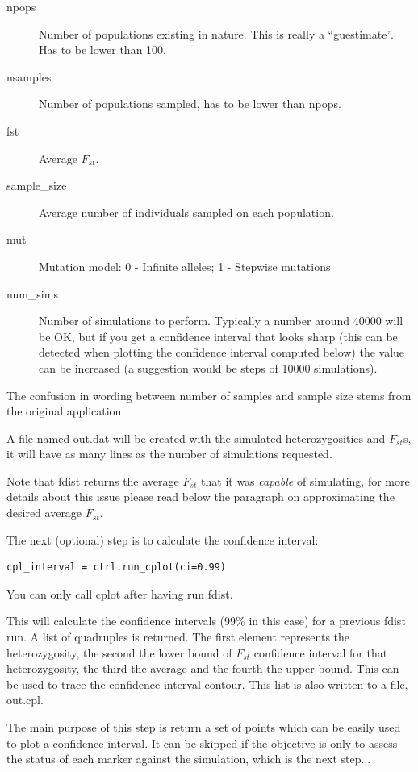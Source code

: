 \documentclass{report}
\begin{document}
\begin{description}
\item[npops] Number of populations existing in nature. This is really a
    ``guestimate''. Has to be lower than 100.
\item[nsamples] Number of populations sampled, has to be lower than npops.
\item[fst] Average $F_{st}$.
\item[sample\_size] Average number of individuals sampled on each population.
\item[mut] Mutation model: 0 - Infinite alleles; 1 - Stepwise mutations
\item[num\_sims] Number of simulations to perform. Typically a number around
    40000 will be OK, but if you get a confidence interval that looks sharp
    (this can be detected when plotting the confidence interval computed
    below) the value can be increased (a suggestion would be steps of 10000
    simulations).
\end{description}

The confusion in wording between number of samples and sample size
stems from the original application.

A file named out.dat will be created with the simulated heterozygosities
and $F_{st}$s, it will have as many lines as the number of simulations
requested.

Note that fdist returns the average $F_{st}$ that it was \emph{capable} of
simulating, for more details about this issue please read below the paragraph
on approximating the desired average $F_{st}$.

The next (optional) step is to calculate the confidence interval:

\begin{verbatim}
cpl_interval = ctrl.run_cplot(ci=0.99)
\end{verbatim}

You can only call cplot after having run fdist.

This will calculate the confidence intervals (99\% in this case)
for a previous fdist run. A list of quadruples is returned. The
first element represents the heterozygosity, the second the lower
bound of $F_{st}$ confidence interval for that heterozygosity,
the third the average and the fourth the upper bound. This can
be used to trace the confidence interval contour. This list
is also written to a file, out.cpl.

The main purpose of this step is return a set of points which can
be easily used to plot a confidence interval. It can be skipped
if the objective is only to assess the status of each marker against
the simulation, which is the next step...
\end{document}
